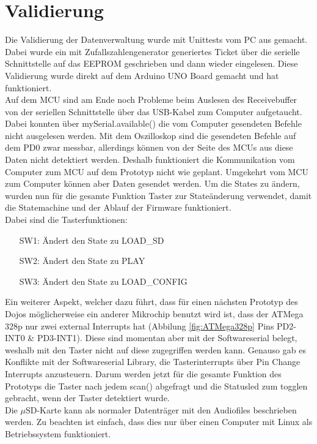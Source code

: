 \section{Validierung}
Die Validierung der Datenverwaltung wurde mit Unittests vom PC aus gemacht. Dabei wurde ein mit Zufallszahlengenerator generiertes Ticket über die serielle Schnittstelle auf das EEPROM geschrieben und dann wieder eingelesen. Diese Validierung wurde direkt auf dem Arduino UNO Board gemacht und hat funktioniert.
\\[0.5cm]
Auf dem MCU sind am Ende noch Probleme beim Auslesen des Receivebuffer von der seriellen Schnittstelle über das USB-Kabel zum Computer aufgetaucht. Dabei konnten über mySerial.available() die vom Computer gesendeten Befehle nicht ausgelesen werden. Mit dem Oszilloskop sind die gesendeten Befehle auf dem PD0 zwar messbar, allerdings können von der Seite des MCUs aus diese \glqq Daten\grqq\; nicht detektiert werden. Deshalb funktioniert die Kommunikation vom Computer zum MCU auf dem Prototyp nicht wie geplant. Umgekehrt vom MCU zum Computer können aber Daten gesendet werden. Um die States zu ändern, wurden nun für die gesamte Funktion Taster zur Stateänderung verwendet, damit die Statemachine und der Ablauf der Firmware funktioniert.
\\[0.5cm]
Dabei sind die Tasterfunktionen:
\begin{itemize}[leftmargin=1.2cm]
\item[SW1:] Ändert den State zu LOAD\_SD
\item[SW2:] Ändert den State zu PLAY
\item[SW3:] Ändert den State zu LOAD\_CONFIG
\end{itemize}
Ein weiterer Aspekt, welcher dazu führt, dass für einen nächsten Prototyp des Dojos möglicherweise ein anderer Mikrochip benutzt wird ist, dass der ATMega 328p nur zwei external Interrupts hat (Abbilung \ref{fig:ATMega328p} Pins PD2-INT0 \& PD3-INT1). Diese sind momentan aber mit der Softwareserial belegt, weshalb mit den Taster nicht auf diese zugegriffen werden kann. Genauso gab es Konflikte mit der Softwareserial Library, die Tasterinterrupts über Pin Change Interrupts anzusteuern. Darum werden jetzt für die gesamte Funktion des Prototyps die Taster nach jedem scan() abgefragt und die Statusled zum togglen gebracht, wenn der Taster detektiert wurde.
\\[0.5cm]
Die $\mu$SD-Karte kann als normaler Datenträger mit den Audiofiles beschrieben werden. Zu beachten ist einfach, dass dies nur über einen Computer mit Linux als Betriebssystem funktioniert.